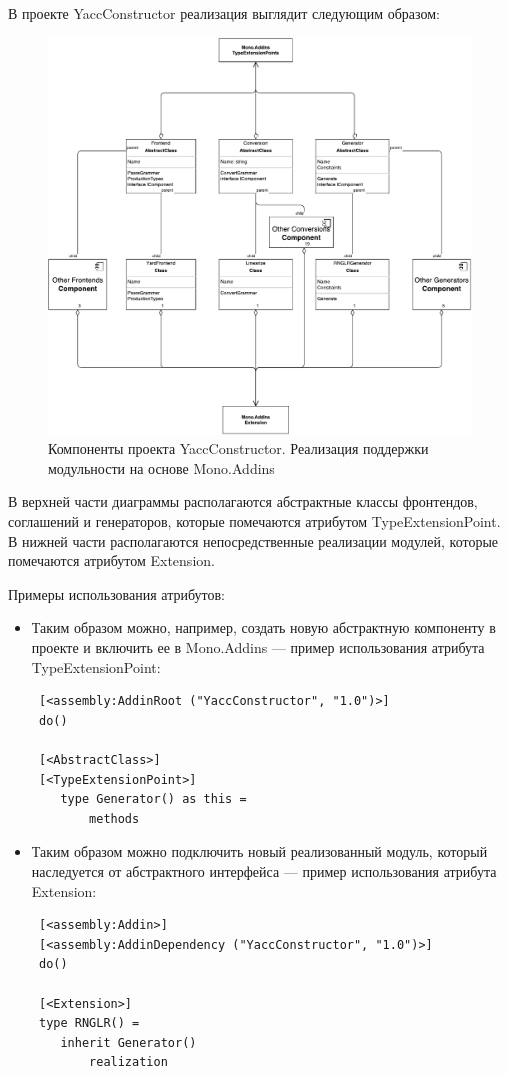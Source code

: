 В проекте YaccConstructor реализация выглядит следующим образом:
\begin{figure}[h!]
\begin{center}
\includegraphics[width=\linewidth]{Orlov/yc_now}
\caption{Компоненты проекта YaccConstructor. Реализация поддержки модульности на основе Mono.Addins}
\label{fig:yc_now} 
\end{center}
\end{figure}

В верхней части диаграммы располагаются абстрактные классы фронтендов, соглашений и генераторов, которые помечаются атрибутом TypeExtensionPoint.
В нижней части располагаются непосредственные реализации модулей, которые помечаются атрибутом Extension.

Примеры использования атрибутов:
\begin{itemize}
\item  Таким образом можно, например, создать новую абстрактную компоненту в проекте и включить ее в Mono.Addins --- пример использования атрибута TypeExtensionPoint:
\begin{verbatim}
 [<assembly:AddinRoot ("YaccConstructor", "1.0")>]
 do()
 
 [<AbstractClass>]
 [<TypeExtensionPoint>]
    type Generator() as this = 
        methods
\end{verbatim}


\item Таким образом можно подключить новый реализованный модуль, который наследуется от абстрактного интерфейса --- пример использования атрибута Extension: 

\begin{verbatim}
 [<assembly:Addin>]
 [<assembly:AddinDependency ("YaccConstructor", "1.0")>]
 do()
 
 [<Extension>]
 type RNGLR() =
    inherit Generator()
        realization
\end{verbatim}
\end{itemize}

